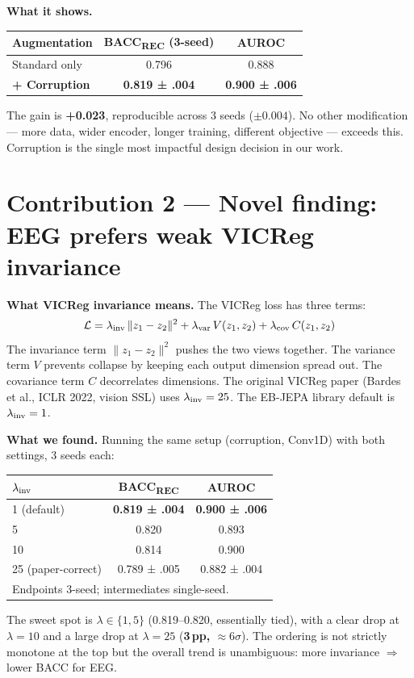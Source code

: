 \documentclass[11pt,a4paper]{article}
\begin{document}
\textbf{What it shows.}
\begin{center}
\begin{tabular}{lcc}
\toprule
Augmentation & BACC\textsubscript{REC} (3-seed) & AUROC \\
\midrule
Standard only & 0.796 & 0.888 \\
\textbf{+ Corruption} & \textbf{0.819 ± .004} & \textbf{0.900 ± .006} \\
\bottomrule
\end{tabular}
\end{center}
The gain is \textbf{+0.023}, reproducible across 3 seeds ($\pm0.004$).
No other modification — more data, wider encoder, longer training, different
objective — exceeds this.  Corruption is the single most impactful design
decision in our work.

\bigskip

\section{Contribution 2 — Novel finding: EEG prefers weak VICReg invariance}

\textbf{What VICReg invariance means.}
The VICReg loss has three terms:
\[
\mathcal{L} = \lambda_{\rm inv}\,\|z_1 - z_2\|^2
            + \lambda_{\rm var}\,V(z_1, z_2)
            + \lambda_{\rm cov}\,C(z_1, z_2)
\]
The invariance term $\|z_1 - z_2\|^2$ pushes the two views together.
The variance term $V$ prevents collapse by keeping each output dimension
spread out.  The covariance term $C$ decorrelates dimensions.
The original VICReg paper (Bardes et al., ICLR 2022, vision SSL)
uses $\lambda_{\rm inv} = 25$.  The EB-JEPA library default is
$\lambda_{\rm inv} = 1$.

\textbf{What we found.}
Running the same setup (corruption, Conv1D) with both settings, 3 seeds each:
\begin{center}
\begin{tabular}{lcc}
\toprule
$\lambda_{\rm inv}$ & BACC\textsubscript{REC} & AUROC \\
\midrule
1 (default) & \textbf{0.819 ± .004} & \textbf{0.900 ± .006} \\
5 & 0.820 & 0.893 \\
10 & 0.814 & 0.900 \\
25 (paper-correct) & 0.789 ± .005 & 0.882 ± .004 \\
\bottomrule
\multicolumn{3}{l}{\footnotesize Endpoints 3-seed; intermediates single-seed.}
\end{tabular}
\end{center}
The sweet spot is $\lambda \in \{1, 5\}$ (0.819--0.820, essentially tied), with a clear
drop at $\lambda{=}10$ and a large drop at $\lambda{=}25$ (\textbf{3\,pp, ${\approx}6\sigma$}).
The ordering is not strictly monotone at the top but the overall trend is unambiguous:
more invariance $\Rightarrow$ lower BACC for EEG.
\end{document}
